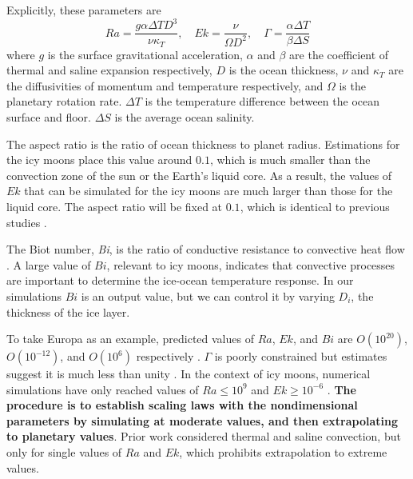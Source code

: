 \documentclass[12pt]{article}
\def\lb{\left(}
\def\rb{\right)}
\begin{document}
Explicitly, these parameters are
\[Ra = \frac{g\alpha\Delta T D^{3}}{\nu\kappa_{T}},\quad Ek = \frac{\nu}{\Omega D^{2}},\quad \Gamma = \frac{\alpha\Delta T}{\beta \Delta S}\]%
where $g$ is the surface gravitational acceleration, $\alpha$ and $\beta$ are the coefficient of thermal and saline expansion respectively, $D$ is the ocean thickness, $\nu$ and $\kappa_T$ are the diffusivities of momentum and temperature respectively, and $\Omega$ is the planetary rotation rate.
$\Delta T$ is the temperature difference between the ocean surface and floor. $\Delta S$ is the average ocean salinity. 

The aspect ratio is the ratio of ocean thickness to planet radius. Estimations for the icy moons place this value around $0.1$\citep{sV18}, which is much smaller than the convection zone of the sun or the Earth's liquid core. As a result, the values of $Ek$ that can be simulated for the icy moons are much larger than those for the liquid core.
The aspect ratio will be fixed at $0.1$, which is identical to previous studies \citep{dL23,kS19}.

The Biot number, \textit{Bi}, is the ratio of conductive resistance to convective heat flow \citep{jL24}. A large value of $Bi$, relevant to icy moons, indicates that convective processes are important to determine the ice-ocean temperature response.
In our simulations $Bi$ is an output value, but we can control it by varying $D_{i}$, the thickness of the ice layer. 


To take Europa as an example, predicted values of $Ra$,  $Ek$, and $Bi$ are $O\lb 10^{20}\rb $, $O\lb 10^{-12}\rb $, and $O\lb 10^{6}\rb $ respectively \citep{dL23}. $\Gamma$ is poorly constrained but estimates suggest it is much less than unity \citep{yA21}. In the context of icy moons, numerical simulations have only reached values of $Ra \le 10^{9}$ and $Ek \ge 10^{-6}$ \citep{dL23}. 
\textbf{The procedure is to establish scaling laws with the nondimensional parameters by simulating at moderate values, and then extrapolating to planetary values}. 
Prior work \citep{yA21} considered thermal and saline convection, but only for single values of $Ra$ and $Ek$, which prohibits extrapolation to extreme values.
\end{document}
